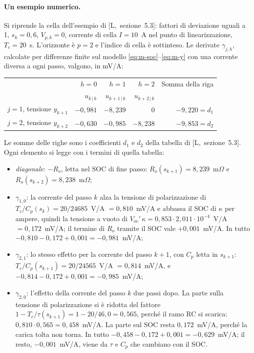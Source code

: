 \documentclass[11pt,a4paper]{article}
\begin{document}
\paragraph{Un esempio numerico.} Si riprende la cella dell'esempio di
[L,~sezione~5.3]: fattori di deviazione uguali a 1, $s_k = 0{,}6$,
$V_{p,k} = 0$, corrente di cella $I = 10$~A nel punto di linearizzazione,
$T_c = 20$~s. L'orizzonte è $p = 2$ e l'indice di cella è sottinteso. Le
derivate $\gamma_{j,h}$, calcolate per differenze finite sul modello
\eqref{eq:m-soc}--\eqref{eq:m-y} con una corrente diversa a ogni passo,
valgono, in mV/A:
\begin{center}
\begin{tabular}{lrrrr}
\toprule
 & $h = 0$ & $h = 1$ & $h = 2$ & Somma della riga \\
 & $u_{k\,|\,k}$ & $u_{k+1\,|\,k}$ & $u_{k+2\,|\,k}$ & \\
\midrule
$j = 1$, tensione $y_{k+1}$ & $-0{,}981$ & $-8{,}239$ & $0$ & $-9{,}220 = d_1$ \\
$j = 2$, tensione $y_{k+2}$ & $-0{,}630$ & $-0{,}985$ & $-8{,}238$ & $-9{,}853 = d_2$ \\
\bottomrule
\end{tabular}
\end{center}
Le somme delle righe sono i coefficienti $d_1$ e $d_2$ della tabella di
[L,~sezione~5.3]. Ogni elemento si legge con i termini di quella tabella:
\begin{itemize}
  \item \emph{diagonale}: $-R_o$, letta nel SOC di fine passo:
        $R_o(s_{k+1}) = 8{,}239$~m$\Omega$ e $R_o(s_{k+2}) = 8{,}238$~m$\Omega$;
  \item $\gamma_{1,0}$: la corrente del passo $k$ alza la tensione di
        polarizzazione di $T_c / C_p(s_k) = 20/24685$~V/A $= 0{,}810$~mV/A e
        abbassa il SOC di $\kappa$ per ampere, quindi la tensione a vuoto di
        $V_{oc}'\,\kappa = 0{,}853 \cdot 2{,}011 \cdot 10^{-4}$~V/A
        $= 0{,}172$~mV/A; il termine di $R_o$ tramite il SOC vale
        $+0{,}001$~mV/A. In tutto $-0{,}810 - 0{,}172 + 0{,}001 = -0{,}981$~mV/A;
  \item $\gamma_{2,1}$: lo stesso effetto per la corrente del passo $k+1$, con
        $C_p$ letta in $s_{k+1}$: $T_c / C_p(s_{k+1}) = 20/24565$~V/A
        $= 0{,}814$~mV/A, e $-0{,}814 - 0{,}172 + 0{,}001 = -0{,}985$~mV/A;
  \item $\gamma_{2,0}$: l'effetto della corrente del passo $k$ due passi dopo.
        La parte sulla tensione di polarizzazione si è ridotta del fattore
        $1 - T_c/\tau(s_{k+1}) = 1 - 20/46{,}0 = 0{,}565$, perché il ramo RC si
        scarica: $0{,}810 \cdot 0{,}565 = 0{,}458$~mV/A. La parte sul SOC resta
        $0{,}172$~mV/A, perché la carica tolta non torna. In tutto
        $-0{,}458 - 0{,}172 + 0{,}001 = -0{,}629$~mV/A; il resto,
        $-0{,}001$~mV/A, viene da $\tau$ e $C_p$ che cambiano con il SOC.
\end{itemize}
\end{document}
